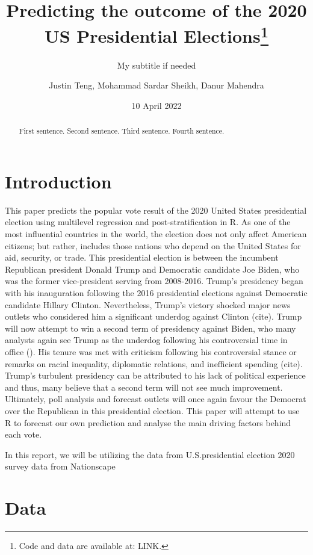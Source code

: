 \documentclass[
]{article}
\title{Predicting the outcome of the 2020 US Presidential Elections\thanks{Code and data are available at: LINK.}}
\subtitle{My subtitle if needed}
\author{Justin Teng, Mohammad Sardar Sheikh, Danur Mahendra}
\date{10 April 2022}
\begin{document}
\maketitle
\begin{abstract}
First sentence. Second sentence. Third sentence. Fourth sentence.
\end{abstract}

\hypertarget{introduction}{%
\section{Introduction}\label{introduction}}

This paper predicts the popular vote result of the 2020 United States presidential election using multilevel regression and post-stratification in R. As one of the most influential countries in the world, the election does not only affect American citizens; but rather, includes those nations who depend on the United States for aid, security, or trade. This presidential election is between the incumbent Republican president Donald Trump and Democratic candidate Joe Biden, who was the former vice-president serving from 2008-2016. Trump's presidency began with his inauguration following the 2016 presidential elections against Democratic candidate Hillary Clinton. Nevertheless, Trump's victory shocked major news outlets who considered him a significant underdog against Clinton (cite). Trump will now attempt to win a second term of presidency against Biden, who many analysts again see Trump as the underdog following his controversial time in office (). His tenure was met with criticism following his controversial stance or remarks on racial inequality, diplomatic relations, and inefficient spending (cite). Trump's turbulent presidency can be attributed to his lack of political experience and thus, many believe that a second term will not see much improvement. Ultimately, poll analysis and forecast outlets will once again favour the Democrat over the Republican in this presidential election. This paper will attempt to use R to forecast our own prediction and analyse the main driving factors behind each vote.

In this report, we will be utilizing the data from U.S.presidential election 2020 survey data from Nationscape

\hypertarget{data}{%
\section{Data}\label{data}}
\end{document}
